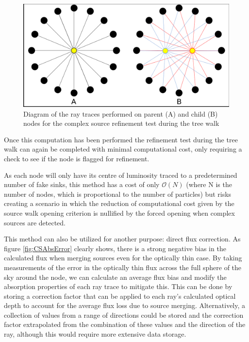 \begin{figure} [H]
    \centering
    \includegraphics[width=\textwidth]{plots/CH4/CSDiagram.png}
    \caption{Diagram of the ray traces performed on parent (A) and child (B) nodes for the complex source refinement test during the tree walk}
    \label{fig:CSrefExample}
\end{figure}

Once this computation has been performed the refinement test during the tree walk can again be completed with minimal computational cost, only requiring a check to see if the node is flagged for refinement.

As each node will only have its centre of luminosity traced to a predetermined number of fake sinks, this method has a cost of only $\mathcal{O}(N)$ (where N is the number of nodes, which is proportional to the number of particles) but risks creating a scenario in which the reduction of computational cost given by the source walk opening criterion is nullified by the forced opening when complex sources are detected. 

This method can also be utilized for another purpose: direct flux correction. As figure \ref{fig:CSAbsError} clearly shows, there is a strong negative bias in the calculated flux when merging sources even for the optically thin case. By taking measurements of the error in the optically thin flux across the full sphere of the sky around the node, we can calculate an average flux bias and modify the absorption properties of each ray trace to mitigate this. This can be done by storing a correction factor that can be applied to each ray's calculated optical depth to account for the average flux loss due to source merging. Alternatively, a collection of values from a range of directions could be stored and the correction factor extrapolated from the combination of these values and the direction of the ray, although this would require more extensive data storage.

